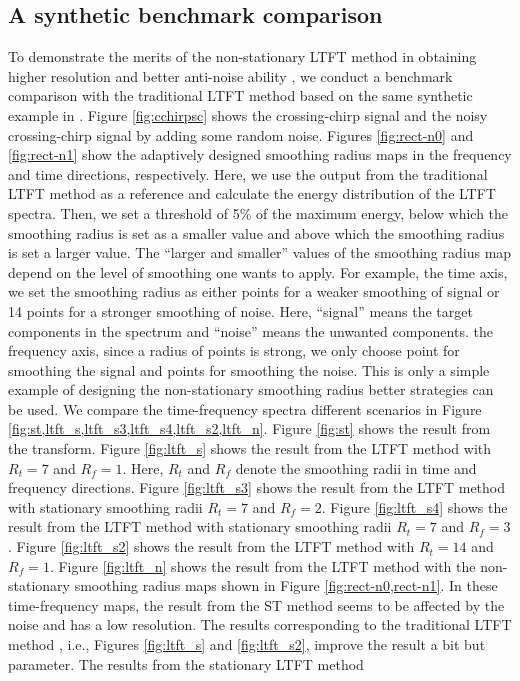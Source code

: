 \subsection{A synthetic benchmark comparison}
To demonstrate the merits of the non-stationary LTFT method in obtaining higher resolution and better anti-noise ability , we conduct a benchmark comparison with the traditional LTFT method based on the same synthetic example in \cite{liuyang2012}. Figure \ref{fig:cchirpsc} shows the crossing-chirp signal \cite[]{liuyang2012}  and  the noisy crossing-chirp signal by adding some random noise. Figures \ref{fig:rect-n0} and \ref{fig:rect-n1} show the adaptively designed smoothing radius maps in the frequency and time directions, respectively. Here, we use the output from the traditional LTFT method as a reference and calculate the energy distribution of the LTFT spectra. Then, we set a threshold of 5\% of the maximum energy, below which the smoothing radius is set as a smaller value and above which the smoothing radius is set a larger value. The ``larger and smaller'' values of the smoothing radius map depend on the level of smoothing one wants to apply. For example,  the time axis, we set the smoothing radius as either  points for a weaker smoothing of signal or 14 points for a stronger smoothing of noise. Here, ``signal'' means the target components in the spectrum and ``noise'' means the unwanted components.  the frequency axis, since a  radius of  points is strong, we only choose  point for smoothing the signal and  points for smoothing the noise.  This is only a simple example of designing the non-stationary smoothing radius better strategies can be used. We compare the time-frequency spectra  different scenarios in Figure \ref{fig:st,ltft_s,ltft_s3,ltft_s4,ltft_s2,ltft_n}. Figure \ref{fig:st} shows the result from the  transform. Figure \ref{fig:ltft_s} shows the result from the LTFT method with $R_t=7$ and $R_f=1$. Here, $R_t$ and $R_f$ denote the smoothing radii in time and frequency directions. Figure \ref{fig:ltft_s3} shows the result from the LTFT method with stationary smoothing radii $R_t=7$ and $R_f=2$. Figure \ref{fig:ltft_s4} shows the result from the LTFT method with stationary smoothing radii $R_t=7$ and $R_f=3$. Figure \ref{fig:ltft_s2} shows the result from the LTFT method with $R_t=14$ and $R_f=1$. Figure \ref{fig:ltft_n} shows the result from the LTFT method with the non-stationary smoothing radius maps shown in Figure \ref{fig:rect-n0,rect-n1}. In these time-frequency maps, the result from the ST method seems to be affected by the noise and has a low resolution. The results corresponding to the traditional LTFT method , i.e., Figures \ref{fig:ltft_s} and \ref{fig:ltft_s2}, improve the result a bit but  parameter. The results from the stationary LTFT method 